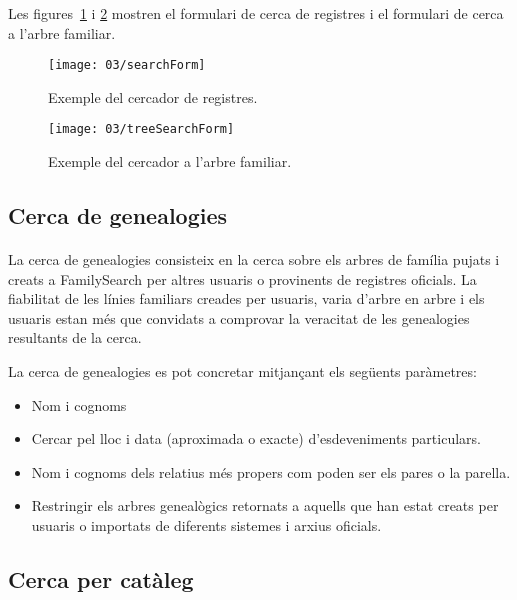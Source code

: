         Les figures~\ref{fig:fsSearcher} i \ref{fig:treeSearcher} mostren el formulari de cerca de registres i el formulari de cerca a l'arbre familiar.

        \begin{figure}[h]
            \texttt{[image: 03/searchForm]}
            \centering
            \caption{Exemple del cercador de registres.\label{fig:fsSearcher}}
        \end{figure}

        \begin{figure}[h]
            \texttt{[image: 03/treeSearchForm]}
            \centering
            \caption{Exemple del cercador a l'arbre familiar.\label{fig:treeSearcher}}
        \end{figure}


    \subsection{Cerca de genealogies}

        \paragraph{}
        La cerca de genealogies consisteix en la cerca sobre els arbres de família pujats i creats a FamilySearch per altres usuaris o provinents de registres oficials. La fiabilitat de les línies familiars creades per usuaris, varia d’arbre en arbre i els usuaris estan més que convidats a comprovar la veracitat de les genealogies resultants de la cerca.

        La cerca de genealogies es pot concretar mitjançant els següents paràmetres:

        \begin{itemize}
            \item Nom i cognoms
            \item Cercar pel lloc i data (aproximada o exacte) d’esdeveniments particulars.
            \item Nom i cognoms dels relatius més propers com poden ser els pares o la parella.
            \item Restringir els arbres genealògics retornats a aquells que han estat creats per usuaris o importats de diferents sistemes i arxius oficials.
        \end{itemize}


    \subsection{Cerca per catàleg}

